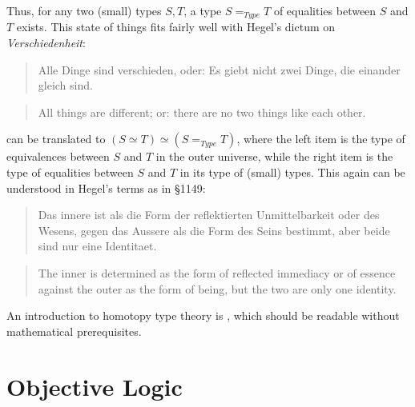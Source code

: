 \documentclass{article}
\begin{document}
Thus, for any two (small) types $S, T$, a type $S=_{Type} T$ of equalities between $S$ and $T$ exists. This state of things fits fairly well with Hegel's dictum on \emph{Verschiedenheit}:

\begin{quote}
   Alle Dinge sind verschieden, oder: Es giebt nicht zwei Dinge, die einander gleich sind.
\end{quote}

\begin{quote}
    All things are different; or: there are no two things like each other.
\end{quote}

can be translated to $(S\simeq T)\simeq (S =_{Type} T)$, where the left item is the type of equivalences between $S$ and $T$ in the outer universe, while the right item is the type of equalities between $S$ and $T$ in its type of (small) types. This again can be understood in Hegel's terms as in §1149:

\begin{quote}
    Das innere ist als die Form der reflektierten Unmittelbarkeit oder des Wesens, gegen das Aussere als die Form des Seins bestimmt, aber beide sind nur eine Identitaet.
\end{quote}

\begin{quote}
    The inner is determined as the form of reflected immediacy or of essence against the outer as the form of being, but the two are only one identity.
\end{quote}

An introduction to homotopy type theory is \cite{hott}, which should be readable without mathematical prerequisites.


\section{Objective Logic}
\end{document}
